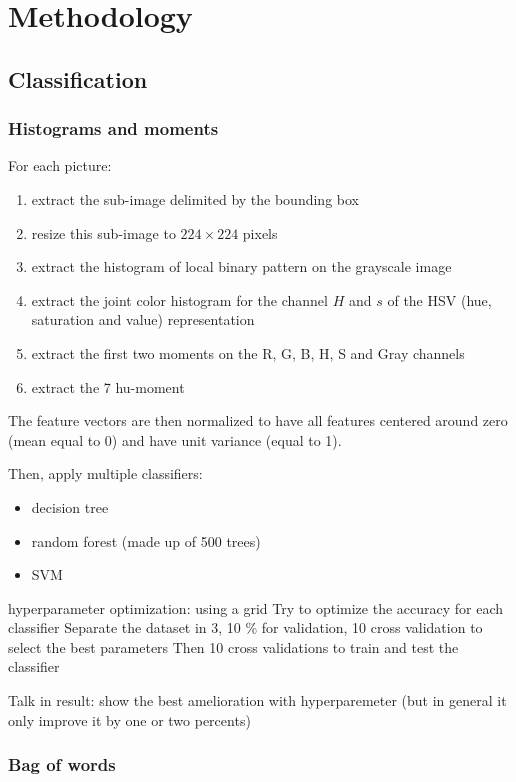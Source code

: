 \chapter{Methodology}
\section{Classification}

\subsection{Histograms and moments}

For each picture:
\begin{enumerate}
    \item extract the sub-image delimited by the bounding box
    \item resize this sub-image to $224 \times 224$ pixels
    \item extract the histogram of local binary pattern on the grayscale image
    \item extract the joint color histogram for the channel $H$ and $s$ of the HSV (hue, saturation and value) representation
    \item extract the first two moments on the R, G, B, H, S and Gray channels
    \item extract the 7 hu-moment
\end{enumerate}

The feature vectors are then normalized to have all features centered around zero (mean equal to 0) and have unit variance (equal to 1).

Then, apply multiple classifiers:
\begin{itemize}
    \item decision tree
    \item random forest (made up of 500 trees)
    \item SVM
\end{itemize}

hyperparameter optimization: using a grid
Try to optimize the accuracy for each classifier
Separate the dataset in 3, 10 \% for validation, 10 cross validation to select the best parameters
Then 10 cross validations to train and test the classifier

Talk in result: show the best amelioration with hyperparemeter (but in general it only improve it by one or two percents)

\subsection{Bag of words}

